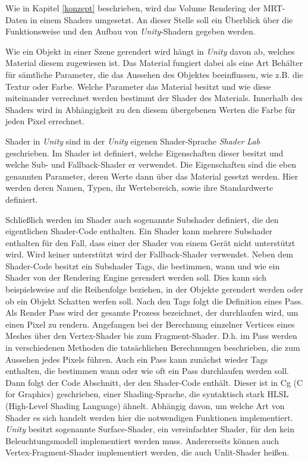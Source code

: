 Wie in Kapitel \ref{konzept} beschrieben, wird das Volume Rendering der MRT-Daten in einem Shaders umgesetzt. An dieser Stelle soll ein Überblick über die Funktionsweise und den Aufbau von \textit{Unity}-Shadern gegeben werden. 

Wie ein Objekt in einer Szene gerendert wird hängt in \textit{Unity} davon ab, welches Material diesem zugewiesen ist. Das Material fungiert dabei als eine Art Behälter für sämtliche Parameter, die das Aussehen des Objektes beeinflussen, wie z.B. die Textur oder Farbe. Welche Parameter das Material besitzt und wie diese miteinander verrechnet werden bestimmt der Shader des Materials. Innerhalb des Shaders wird in Abhängigkeit zu den diesem übergebenen Werten die Farbe für jeden Pixel errechnet. 

Shader in \textit{Unity} sind in der \textit{Unity} eigenen Shader-Sprache \textit{Shader Lab} geschrieben. Im Shader ist definiert, welche Eigenschaften dieser besitzt und welche Sub- und Fallback-Shader er verwendet.
Die Eigenschaften sind die eben genannten Parameter, deren Werte dann über das Material gesetzt werden. Hier werden deren Namen, Typen, ihr Wertebereich, sowie ihre Standardwerte definiert. 

Schließlich werden im Shader auch sogenannte Subshader definiert, die den eigentlichen Shader-Code enthalten.
Ein Shader kann mehrere Subshader enthalten für den Fall, dass einer der Shader von einem Gerät nicht unterstützt wird. Wird keiner unterstützt wird der Fallback-Shader verwendet. 
Neben dem Shader-Code besitzt ein Subshader Tags, die bestimmen, wann und wie ein Shader von der Rendering Engine gerendert werden soll. Dies kann sich beispielsweise auf die Reihenfolge beziehen, in der Objekte gerendert werden oder ob ein Objekt Schatten werfen soll. 
Nach den Tags folgt die Definition eines Pass. Als Render Pass wird der gesamte Prozess bezeichnet, der durchlaufen wird, um einen Pixel zu rendern. Angefangen bei der Berechnung einzelner Vertices eines Meshes über den Vertex-Shader bis zum Fragment-Shader. D.h. im Pass werden in verschiedenen Methoden die tatsächlichen Berechnungen beschrieben, die zum Aussehen jedes Pixels führen. 
Auch ein Pass kann zunächst wieder Tags enthalten, die bestimmen wann oder wie oft ein Pass durchlaufen werden soll. 
Dann folgt der Code Abschnitt, der den Shader-Code enthält. Dieser ist in Cg (C for Graphics)
 geschrieben, einer Shading-Sprache, die syntaktisch stark HLSL (High-Level Shading Language) ähnelt. 
Abhängig davon, um welche Art von Shader es sich handelt werden hier die notwendigen Funktionen implementiert. \textit{Unity} besitzt sogenannte Surface-Shader, ein vereinfachter Shader, für den kein Beleuchtungsmodell implementiert werden muss. Andererseits können auch Vertex-Fragment-Shader implementiert werden, die auch Unlit-Shader heißen. 

